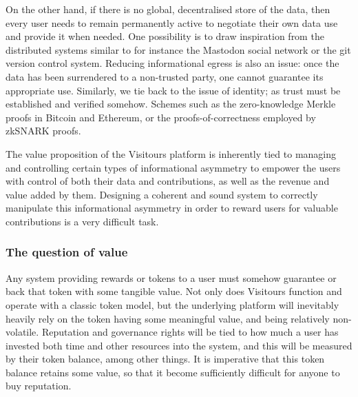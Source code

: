 \documentclass[fontsize=12pt,a4paper]{article}
\begin{document}
On the other hand, if there is no global, decentralised store of the data, then every user needs to remain permanently active to negotiate their own data use and provide it when needed. One possibility is to draw inspiration from the distributed systems similar to for instance the Mastodon social network or the git version control system. Reducing informational egress is also an issue: once the data has been surrendered to a non-trusted party, one cannot guarantee its appropriate use. Similarly, we tie back to the issue of identity; as trust must be established and verified somehow. Schemes such as the zero-knowledge Merkle proofs in Bitcoin and Ethereum, or the proofs-of-correctness employed by zkSNARK proofs.

The value proposition of the Visitours platform is inherently tied to managing and controlling certain types of informational asymmetry to empower the users with control of both their data and contributions, as well as the revenue and value added by them. Designing a coherent and sound system to correctly manipulate this informational asymmetry in order to reward users for valuable contributions is a very difficult task.

\subsubsection*{The question of value}

Any system providing rewards or tokens to a user must somehow guarantee or back that token with some tangible value. Not only does Visitours function and operate with a classic token model, but the underlying platform will inevitably heavily rely on the token having some meaningful value, and being relatively non-volatile. Reputation and governance rights will be tied to how much a user has invested both time and other resources into the system, and this will be measured by their token balance, among other things. It is imperative that this token balance retains some value, so that it become sufficiently difficult for anyone to buy reputation.
\end{document}
